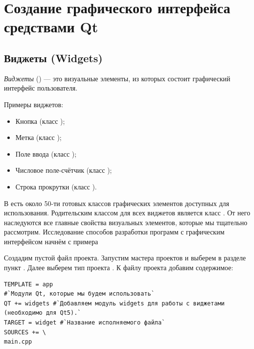 \chapter[Создание графического интерфейса средствами Qt]{Создание графического интерфейса средствами Qt}
\section[Виджеты (Widgets)]{Виджеты (Widgets)}\label{ch13:1}
\emph{Виджеты} () --- это визуальные элементы, из которых состоит графический интерфейс
пользователя.

Примеры виджетов:

\begin{itemize}
\item Кнопка (класс );
\item Метка (класс );
\item Поле ввода (класс );
\item Числовое поле-счётчик (класс );
\item Строка прокрутки (класс ).
\end{itemize}

В  есть около 50-ти готовых классов графических элементов доступных для использования. Родительским классом для всех
виджетов является  класс . От него наследуются все главные свойства визуальных
элементов, которые мы тщательно рассмотрим. Исследование способов разработки программ с графическим интерфейсом начнём
с примера

Создадим пустой файл проекта. Запустим мастера проектов и выберем в разделе
 пункт . Далее выберем тип проекта
. К файлу проекта добавим содержимое:
\begin{lstlisting}
TEMPLATE = app
#`Модули Qt, которые мы будем использовать`
QT += widgets #`Добавляем модуль widgets для работы с виджетами (необходимо для Qt5).`
TARGET = widget #`Название исполняемого файла`
SOURCES += \
main.cpp
\end{lstlisting}

